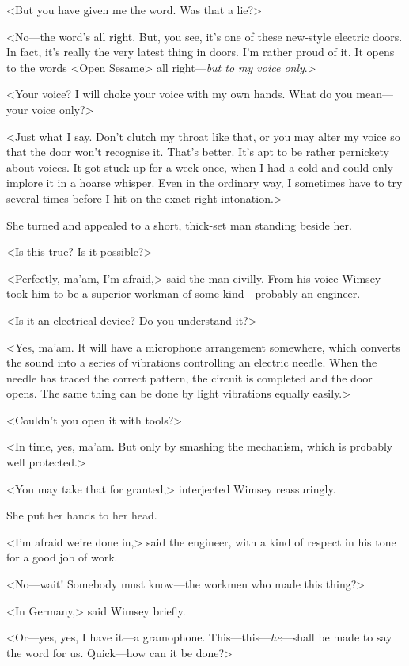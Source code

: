 <But you have given me the word. Was that a lie?>

<No—the word's all right. But, you see, it's one of these new-style electric doors. In fact, it's really the very latest thing in doors. I'm rather proud of it. It opens to the words <Open Sesame> all right—\textit{but to my voice only}.>

<Your voice? I will choke your voice with my own hands. What do you mean—your voice only?>

<Just what I say. Don't clutch my throat like that, or you may alter my voice so that the door won't recognise it. That's better. It's apt to be rather pernickety about voices. It got stuck up for a week once, when I had a cold and could only implore it in a hoarse whisper. Even in the ordinary way, I sometimes have to try several times before I hit on the exact right intonation.>

She turned and appealed to a short, thick-set man standing beside her.

<Is this true? Is it possible?>

<Perfectly, ma'am, I'm afraid,> said the man civilly. From his voice Wimsey took him to be a superior workman of some kind—probably an engineer.

<Is it an electrical device? Do you understand it?>

<Yes, ma'am. It will have a microphone arrangement somewhere, which converts the sound into a series of vibrations controlling an electric needle. When the needle has traced the correct pattern, the circuit is completed and the door opens. The same thing can be done by light vibrations equally easily.>

<Couldn't you open it with tools?>

<In time, yes, ma'am. But only by smashing the mechanism, which is probably well protected.>

<You may take that for granted,> interjected Wimsey reassuringly.

She put her hands to her head.

<I'm afraid we're done in,> said the engineer, with a kind of respect in his tone for a good job of work.

<No—wait! Somebody must know—the workmen who made this thing?>

<In Germany,> said Wimsey briefly.

<Or—yes, yes, I have it—a gramophone. This—this—\textit{he}—shall be made to say the word for us. Quick—how can it be done?>

